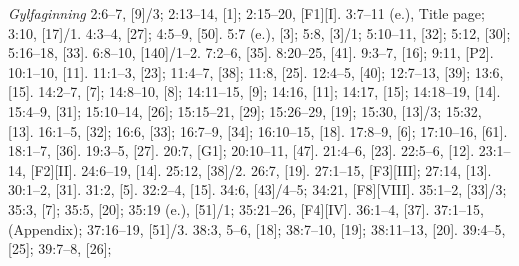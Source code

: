 \begin{itemize}
\emph{Gylfaginning} 2:6--7, [9]/3;
2:13--14, [1];
2:15--20, [F1][I].
3:7--11 (e.), Title page;
3:10, [17]/1.
4:3--4, [27];
4:5--9, [50].
5:7 (e.), [3];
5:8, [3]/1;
5:10--11, [32];
5:12, [30];
5:16--18, [33].
6:8--10, [140]/1--2.
7:2--6, [35].
8:20--25, [41].
9:3--7, [16];
9:11, [P2].
10:1--10, [11].
11:1--3, [23];
11:4--7, [38];
11:8, [25].
12:4--5, [40];
12:7--13, [39];
13:6, [15].
14:2--7, [7];
14:8--10, [8];
14:11--15, [9];
14:16, [11];
14:17, [15];
14:18--19, [14].
15:4--9, [31];
15:10--14, [26];
15:15--21, [29];
15:26--29, [19];
15:30, [13]/3;
15:32, [13].
16:1--5, [32];
16:6, [33];
16:7--9, [34];
16:10--15, [18].
17:8--9, [6];
17:10--16, [61].
18:1--7, [36].
19:3--5, [27].
20:7, [G1];
20:10--11, [47].
21:4--6, [23].
22:5--6, [12].
23:1--14, [F2][II].
24:6--19, [14].
25:12, [38]/2.
26:7, [19].
27:1--15, [F3][III];
27:14, [13].
30:1--2, [31].
31:2, [5].
32:2--4, [15].
34:6, [43]/4--5;
34:21, [F8][VIII].
35:1--2, [33]/3;
35:3, [7];
35:5, [20];
35:19 (e.), [51]/1;
35:21--26, [F4][IV].
36:1--4, [37].
37:1--15,  (Appendix);
37:16--19, [51]/3.
38:3, 5--6, [18];
38:7--10, [19];
38:11--13, [20].
39:4--5, [25];
39:7--8, [26];

\end{itemize}

